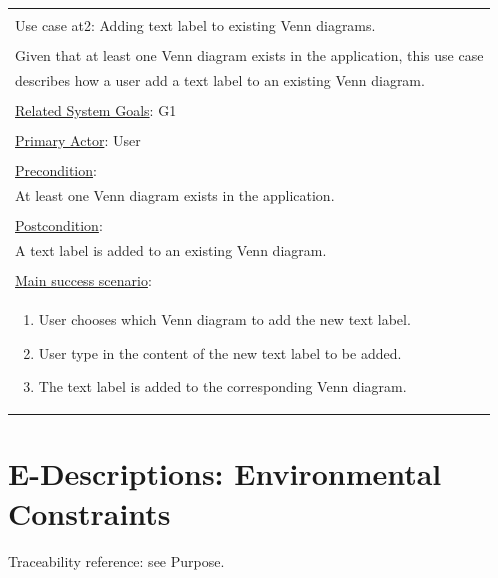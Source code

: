 \documentclass[fontsize=12pt,paper=letter,twoside]{scrartcl}
\begin{document}
\begin{table}[h]
	\begin{tabular}{|l|}
		\hline
		\\
		Use case at2: Adding text label to existing Venn diagrams.							\\
		\\
		Given that at least one Venn diagram exists in the application, this use case		\\
		describes how a user add a text label to an existing Venn diagram.					\\
		\\
		\underline{Related System Goals}: G1												\\
		\\
		\underline{Primary Actor}: User														\\
		\\
		\underline{Precondition}:															\\ \qquad
		At least one Venn diagram exists in the application.								\\
		\\
		\underline{Postcondition}:															\\ \qquad
		A text label is added to an existing Venn diagram.									\\
		\\
		\underline{Main success scenario}:													\\
		\begin{minipage}{6in}
			\vskip 4pt
			\begin{enumerate}
				\item User chooses which Venn diagram to add the new text label.
				\item User type in the content of the new text label to be added.
				\item The text label is added to the corresponding Venn diagram.
			\end{enumerate}
			\vskip 4pt
		\end{minipage}
		\\
		\hline
	\end{tabular}
\end{table}

\newpage
\section{E-Descriptions: Environmental Constraints}

{Traceability reference: see Purpose.}
\end{document}
